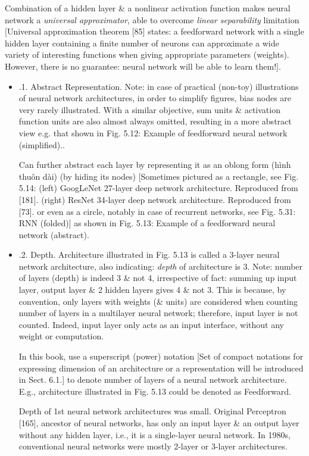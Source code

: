 \documentclass{article}
\begin{document}
\begin{itemize}
\begin{itemize}
		Combination of a hidden layer \& a nonlinear activation function makes neural network a {\it universal approximator}, able to overcome {\it linear separability} limitation [Universal approximation theorem [85] states: a feedforward network with a single hidden layer containing a finite number of neurons can approximate a wide variety of interesting functions when giving appropriate parameters (weights). However, there is no guarantee: neural network will be able to learn them!].
		\begin{itemize}
			\item {.1. Abstract Representation.} Note: in case of practical (non-toy) illustrations of neural network architectures, in order to simplify figures, bias nodes are very rarely illustrated. With a similar objective, sum units \& activation function units are also almost always omitted, resulting in a more abstract view e.g. that shown in {\sf Fig. 5.12: Example of feedforward neural network (simplified).}.

			Can further abstract each layer by representing it as an oblong form (hình thuôn dài) (by hiding its nodes) [Sometimes pictured as a rectangle, see {\sf Fig. 5.14: (left) GoogLeNet 27-layer deep network architecture. Reproduced from [181]. (right) ResNet 34-layer deep network architecture. Reproduced from [73].} or even as a circle, notably in case of recurrent networks, see {\sf Fig. 5.31: RNN (folded)}] as shown in {\sf Fig. 5.13: Example of a feedforward neural network (abstract)}.
			\item {.2. Depth.} Architecture illustrated in {\sf Fig. 5.13} is called a 3-layer neural network architecture, also indicating: {\it depth} of architecture is 3. Note: number of layers (depth) is indeed 3 \& not 4, irrespective of fact: summing up input layer, output layer \& 2 hidden layers gives 4 \& not 3. This is because, by convention, only layers with weights (\& units) are considered when counting number of layers in a multilayer neural network; therefore, input layer is not counted. Indeed, input layer only acts as an input interface, without any weight or computation.

			In this book, use a superscript (power) notation [Set of compact notations for expressing dimension of an architecture or a representation will be introduced in Sect. 6.1.] to denote number of layers of a neural network architecture. E.g., architecture illustrated in {\sf Fig. 5.13} could be denoted as Feedforward.

			Depth of 1st neural network architectures was small. Original Perceptron [165], ancestor of neural networks, has only an input layer \& an output layer without any hidden layer, i.e., it is a single-layer neural network. In 1980s, conventional neural networks were mostly 2-layer or 3-layer architectures.


\end{itemize}
\end{itemize}
\end{itemize}
\end{document}
